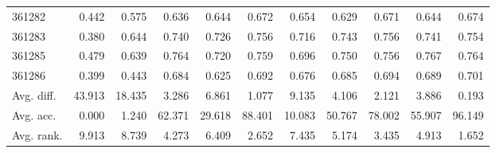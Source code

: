 \begin{tabular}{lrrrrrrrrrr}
361282 & 0.442 & 0.575 & 0.636 & 0.644 & 0.672 & 0.654 & 0.629 & 0.671 & 0.644 & 0.674 \\
361283 & 0.380 & 0.644 & 0.740 & 0.726 & 0.756 & 0.716 & 0.743 & 0.756 & 0.741 & 0.754 \\
361285 & 0.479 & 0.639 & 0.764 & 0.720 & 0.759 & 0.696 & 0.750 & 0.756 & 0.767 & 0.764 \\
361286 & 0.399 & 0.443 & 0.684 & 0.625 & 0.692 & 0.676 & 0.685 & 0.694 & 0.689 & 0.701 \\
Avg. diff. & 43.913 & 18.435 & 3.286 & 6.861 & 1.077 & 9.135 & 4.106 & 2.121 & 3.886 & 0.193 \\
Avg. acc. & 0.000 & 1.240 & 62.371 & 29.618 & 88.401 & 10.083 & 50.767 & 78.002 & 55.907 & 96.149 \\
Avg. rank. & 9.913 & 8.739 & 4.273 & 6.409 & 2.652 & 7.435 & 5.174 & 3.435 & 4.913 & 1.652 \\
\bottomrule
\end{tabular}
